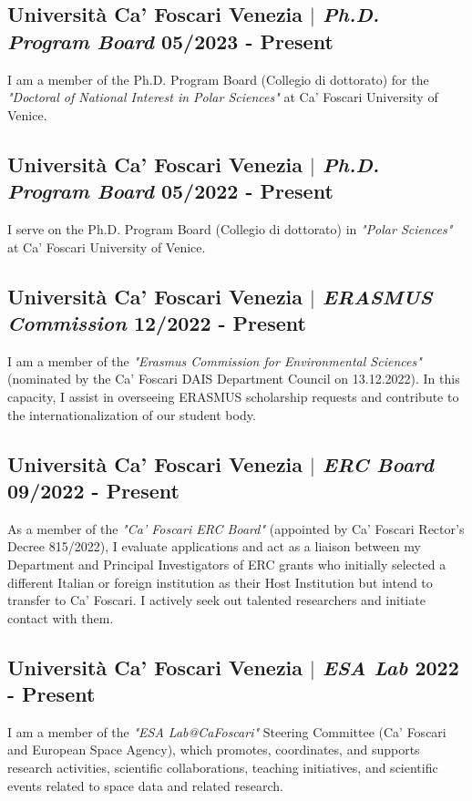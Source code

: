 \documentclass[11pt]{article}
\begin{document}
\bigskip

\subsection{Università Ca' Foscari Venezia $|$ {\normalfont\textit{Ph.D. Program Board}} \hfill 05/2023 - Present}
{\footnotesize I am a member of the Ph.D. Program Board (Collegio di dottorato) for the \textit{"Doctoral of National Interest in Polar Sciences"} at Ca' Foscari University of Venice.}
\bigskip

\subsection{Università Ca' Foscari Venezia $|$ {\normalfont\textit{Ph.D. Program Board}} \hfill 05/2022 - Present}
{\footnotesize I serve on the Ph.D. Program Board (Collegio di dottorato) in \textit{"Polar Sciences"} at Ca' Foscari University of Venice.}
\bigskip

\subsection{Università Ca' Foscari Venezia  $|$ {\normalfont\textit{ERASMUS Commission}} \hfill 12/2022 - Present}
{\footnotesize I am a member of the \textit{"Erasmus Commission for Environmental Sciences"} (nominated by the Ca' Foscari DAIS Department Council on 13.12.2022). In this capacity, I assist in overseeing ERASMUS scholarship requests and contribute to the internationalization of our student body.}
\bigskip

\subsection{Università Ca' Foscari Venezia  $|$ {\normalfont\textit{ERC Board}} \hfill 09/2022 - Present}
{\footnotesize As a member of the \textit{"Ca' Foscari ERC Board"} (appointed by Ca' Foscari Rector’s Decree 815/2022), I evaluate applications and act as a liaison between my Department and Principal Investigators of ERC grants who initially selected a different Italian or foreign institution as their Host Institution but intend to transfer to Ca' Foscari. I actively seek out talented researchers and initiate contact with them.}
\bigskip

\subsection{Università Ca' Foscari Venezia  $|$ {\normalfont\textit{ESA Lab}} \hfill 2022 - Present}
{\footnotesize I am a member of the \textit{"ESA Lab@CaFoscari"} Steering Committee (Ca' Foscari and European Space Agency), which promotes, coordinates, and supports research activities, scientific collaborations, teaching initiatives, and scientific events related to space data and related research.}
\end{document}
